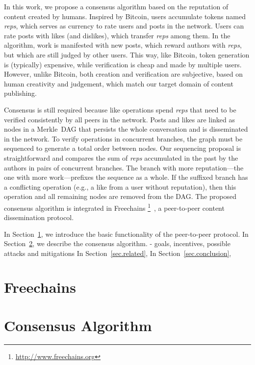 \documentclass[10pt,journal,compsoc]{IEEEtran}
\begin{document}
In this work, we propose a consensus algorithm based on the reputation of
content created by humans.
Inspired by Bitcoin, users accumulate tokens named \emph{reps}, which serves as
currency to rate users and posts in the network.
Users can rate posts with likes (and dislikes), which transfer \emph{reps}
among them.
In the algorithm, work is manifested with new posts, which reward authors with
\emph{reps}, but which are still judged by other users.
This way, like Bitcoin, token generation is (typically) expensive, while
verification is cheap and made by multiple users.
However, unlike Bitcoin, both creation and verification are subjective, based
on human creativity and judgement, which match our target domain of content
publishing.

Consensus is still required because like operations spend \emph{reps} that need
to be verified consistently by all peers in the network.
Posts and likes are linked as nodes in a Merkle~DAG that persists the whole
conversation and is disseminated in the network.
To verify operations in concurrent branches, the graph must be sequenced to
generate a total order between nodes.
Our sequencing proposal is straightforward and compares the sum of \emph{reps}
accumulated in the past by the authors in pairs of concurrent branches.
The branch with more reputation---the one with more work---prefixes the
sequence as a whole.
If the suffixed branch has a conflicting operation (e.g., a like from a user
without reputation), then this operation and all remaining nodes are removed
from the DAG.
The proposed consensus algorithm is integrated in Freechains%
\footnote{\url{http://www.freechains.org}}~\cite{fcs.sbseg20},
a peer-to-peer content dissemination protocol.

In Section~\ref{sec.freechains}, we introduce the basic functionality of
the peer-to-peer protocol.
In Section~\ref{sec.consensus}, we describe the consensus algorithm.
- goals, incentives, possible attacks and mitigations
In Section~\ref{sec.related},
In Section~\ref{sec.conclusion},

\section{Freechains}
\label{sec.freechains}

\section{Consensus Algorithm}
\label{sec.consensus}
\end{document}
